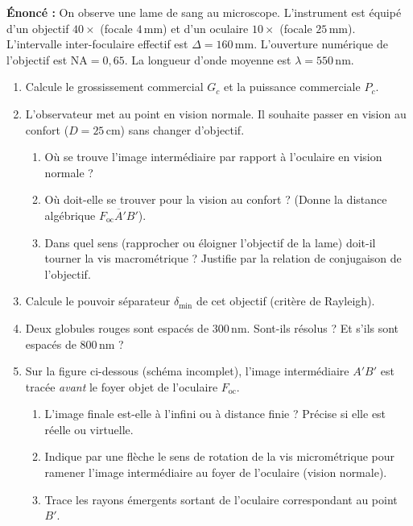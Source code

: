 \documentclass[11pt]{article}
\begin{document}
\begin{exercice}
\textbf{Énoncé :} On observe une lame de sang au microscope. L'instrument est équipé d'un objectif $40\times$ (focale $4\,\text{mm}$) et d'un oculaire $10\times$ (focale $25\,\text{mm}$). L'intervalle inter-foculaire effectif est $\Delta = 160\,\text{mm}$. L'ouverture numérique de l'objectif est $\text{NA} = 0,65$. La longueur d'onde moyenne est $\lambda = 550\,\text{nm}$.
\begin{enumerate}
    \item Calcule le grossissement commercial $G_c$ et la puissance commerciale $P_c$.
    \item L'observateur met au point en vision normale. Il souhaite passer en vision au confort ($D = 25\,\text{cm}$) sans changer d'objectif. 
    \begin{enumerate}
        \item Où se trouve l'image intermédiaire par rapport à l'oculaire en vision normale ?
        \item Où doit-elle se trouver pour la vision au confort ? (Donne la distance algébrique $\overline{F_{\text{oc}}A'B'}$).
        \item Dans quel sens (rapprocher ou éloigner l'objectif de la lame) doit-il tourner la vis macrométrique ? Justifie par la relation de conjugaison de l'objectif.
    \end{enumerate}
    \item Calcule le pouvoir séparateur $\delta_{\text{min}}$ de cet objectif (critère de Rayleigh).
    \item Deux globules rouges sont espacés de $300\,\text{nm}$. Sont-ils résolus ? Et s'ils sont espacés de $800\,\text{nm}$ ?
    \item Sur la figure ci-dessous (schéma incomplet), l'image intermédiaire $A'B'$ est tracée \emph{avant} le foyer objet de l'oculaire $F_{\text{oc}}$.
    \begin{enumerate}
        \item L'image finale est-elle à l'infini ou à distance finie ? Précise si elle est réelle ou virtuelle.
        \item Indique par une flèche le sens de rotation de la vis micrométrique pour ramener l'image intermédiaire au foyer de l'oculaire (vision normale).
        \item Trace les rayons émergents sortant de l'oculaire correspondant au point $B'$.
    \end{enumerate}
\end{enumerate}
\end{exercice}
\end{document}
